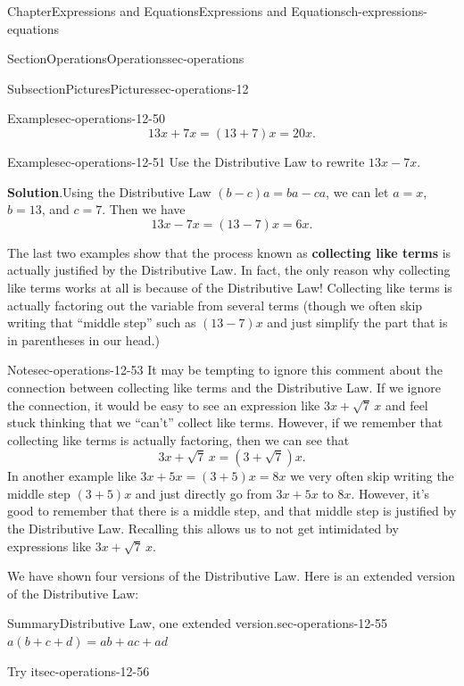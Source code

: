 \documentclass[twoside,11pt,]{book}
\newcommand{\blocktitlefont}{\relax}
\newcommand{\terminology}[1]{\textbf{#1}}
\numberwithin{equation}{chapter}
\begin{document}
\begin{chapterptx}{Chapter}{Expressions and Equations}{}{Expressions and Equations}{}{}{ch-expressions-equations}
\begin{sectionptx}{Section}{Operations}{}{Operations}{}{}{sec-operations}
\begin{subsectionptx}{Subsection}{Pictures}{}{Pictures}{}{}{sec-operations-12}
\begin{example}{Example}{}{sec-operations-12-50}
\begin{equation*}
13x + 7x = (13 + 7)x = 20x.
\end{equation*}
%
\end{example}
\begin{example}{Example}{}{sec-operations-12-51}%
Use the Distributive Law to rewrite \(13x - 7x\).%
\par\smallskip%
\noindent\textbf{\blocktitlefont Solution}.\hypertarget{sec-operations-12-51-2}{}\quad{}Using the Distributive Law \((b-c)a=ba-ca\), we can let \(a=x\), \(b=13\), and \(c=7\). Then we have%
\begin{equation*}
13x - 7x = (13 - 7)x = 6x.
\end{equation*}
%
\end{example}
The last two examples show that the process known as \terminology{collecting like terms} is actually justified by the Distributive Law. In fact, the only reason why collecting like terms works at all is because of the Distributive Law! Collecting like terms is actually factoring out the variable from several terms (though we often skip writing that ``middle step'' such as \((13-7)x\) and just simplify the part that is in parentheses in our head.)%
\begin{note}{Note}{}{sec-operations-12-53}%
It may be tempting to ignore this comment about the connection between collecting like terms and the Distributive Law. If we ignore the connection, it would be easy to see an expression like \(3x + \sqrt{7}\,x\) and feel stuck thinking that we ``can't'' collect like terms. However, if we remember that collecting like terms is actually factoring, then we can see that%
\begin{equation*}
3x + \sqrt{7}\,x = (3 + \sqrt{7})x.
\end{equation*}
In another example like \(3x+5x=(3+5)x=8x\) we very often skip writing the middle step \((3+5)x\) and just directly go from \(3x+5x\) to \(8x\). However, it's good to remember that there is a middle step, and that middle step is justified by the Distributive Law. Recalling this allows us to not get intimidated by expressions like \(3x + \sqrt{7}\,x\).%
\end{note}
We have shown four versions of the Distributive Law. Here is an extended version of the Distributive Law:%
\begin{assemblage}{Summary}{Distributive Law, one extended version.}{sec-operations-12-55}%
\(a(b+c+d)=ab+ac+ad\)%
\end{assemblage}
\begin{inlineexercise}{Try it}{}{sec-operations-12-56}%

\end{inlineexercise}
\end{subsectionptx}
\end{sectionptx}
\end{chapterptx}
\end{document}
